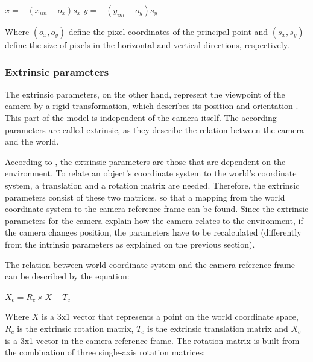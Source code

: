 \documentclass[msc, a4paper, classic, en]{ufbathesis}
\begin{document}
\begin{center}
$x = -(x_{im} - o_x)s_x$
$y = -(y_{im} - o_y)s_y$
\end{center}

Where $(o_x, o_y)$ define the pixel coordinates of the principal point and $(s_x, s_y)$ define the size of pixels in the horizontal and vertical directions, respectively.

\subsubsection{Extrinsic parameters}

The extrinsic parameters, on the other hand, represent the viewpoint of the camera by a rigid transformation, which describes its position and orientation \cite{bajramovic2010self}. This part of the model is independent of the camera itself. The according parameters are called extrinsic, as they describe the relation between the camera and the world.

According to \cite{tillapaugh2008indirect}, the extrinsic parameters are those that are dependent on the environment. To relate an object's coordinate system to the world's coordinate system, a translation and a rotation matrix are needed. Therefore, the extrinsic parameters consist of these two matrices, so that a mapping from the world coordinate system to the camera reference frame can be found. Since the extrinsic parameters for the camera explain how the camera relates to the environment, if the camera changes position, the parameters have to be recalculated (differently from the intrinsic parameters as explained on the previous section).

The relation between world coordinate system and the camera reference frame can be described by the equation:

\begin{center}
$X_c = R_c \times X + T_c$
\end{center}

Where $X$ is a 3x1 vector that represents a point on the world coordinate space, $R_c$ is the extrinsic rotation matrix, $T_c$ is the extrinsic translation matrix and $X_c$ is a 3x1 vector in the camera reference frame. The rotation matrix is built from the combination of three single-axis rotation matrices:
\end{document}
